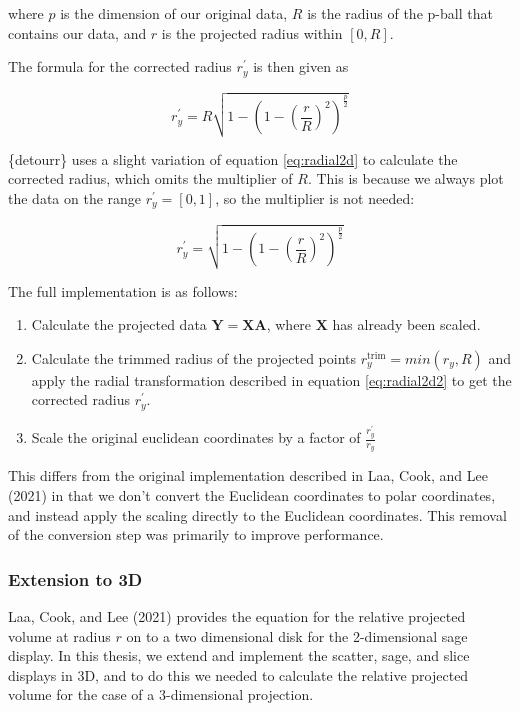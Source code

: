 where \(p\) is the dimension of our original data, \(R\) is the radius of the p-ball that contains our data, and \(r\) is the projected radius within \([0, R]\).

The formula for the corrected radius \(r_y^\prime\) is then given as

\begin{equation}
r_y^\prime = R \sqrt{1 - \left(1-\left(\frac{r}{R}\right)^2\right)^\frac{p}{2}}
\label{eq:radial2d}
\end{equation}

\{detourr\} uses a slight variation of equation \eqref{eq:radial2d} to calculate the corrected radius, which omits the multiplier of \(R\). This is because we always plot the data on the range \(r_y^\prime = [0, 1]\), so the multiplier is not needed:

\begin{equation}
r_y^\prime = \sqrt{1 - \left(1-\left(\frac{r}{R}\right)^2\right)^\frac{p}{2}}
\label{eq:radial2d2}
\end{equation}

The full implementation is as follows:

\begin{enumerate}
\def\labelenumi{\arabic{enumi}.}
\tightlist
\item
  Calculate the projected data \(\mathbf{Y} = \mathbf{XA}\), where \(\mathbf{X}\) has already been scaled.
\item
  Calculate the trimmed radius of the projected points \(r_y^\mathrm{trim} = min(r_y, R)\) and apply the radial transformation described in equation \eqref{eq:radial2d2} to get the corrected radius \(r_y^\prime\).
\item
  Scale the original euclidean coordinates by a factor of \(\frac{r_y^\prime}{r_y}\)
\end{enumerate}

This differs from the original implementation described in Laa, Cook, and Lee (2021) in that we don't convert the Euclidean coordinates to polar coordinates, and instead apply the scaling directly to the Euclidean coordinates. This removal of the conversion step was primarily to improve performance.

\hypertarget{extension-to-3d}{%
\subsubsection{Extension to 3D}\label{extension-to-3d}}

Laa, Cook, and Lee (2021) provides the equation for the relative projected volume at radius \(r\) on to a two dimensional disk for the 2-dimensional sage display. In this thesis, we extend and implement the scatter, sage, and slice displays in 3D, and to do this we needed to calculate the relative projected volume for the case of a 3-dimensional projection.

